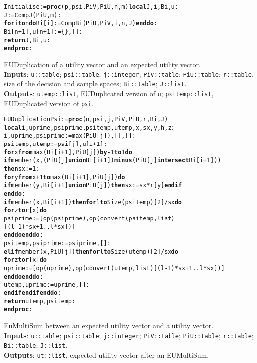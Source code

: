 \vspace{-0.4cm}
\begin{alltt}
Initialise := \textbf{proc}(p, psi, PiV, PiU, n, m) \textbf{local} J, i, Bi, u:
J := CompJ(PiU, m):
\textbf{for} i \textbf{to} n \textbf{do}  Bi[i] := CompBi(PiU, PiV, i, n, J) \textbf{end do}:
Bi[n+1], u[n+1] := \{\}, []:
\textbf{return} J, Bi, u:
\textbf{end proc}:
\end{alltt}


\noindent EUDuplication of a utility vector and an expected utility vector.\\
\textbf{Inputs}: \verb|u::table|; \verb|psi::table|; \verb|j::integer|; \verb|PiV::table|; \verb|PiU::table|;
\verb|r::table|, size of the decision and sample spaces; \verb|Bi::table|; \verb|J::list|.\\
\textbf{Outputs}: \verb|utemp::list|, EUDuplicated version of \verb|u|; \verb|psitemp::list|, EUDuplicated version of \verb|psi|.

\vspace{-0.4cm}
\begin{alltt}
EUDuplicationPsi := \textbf{proc}(u, psi, j, PiV, PiU, r, Bi, J)
\textbf{local} i, uprime, psiprime, psitemp, utemp, x, sx, y, h, z:
i, uprime, psiprime:= max(PiU[j]), [], []: 
psitemp, utemp:= psi[j], u[i+1]:
\textbf{for} x \textbf{from} max(Bi[i+1], PiU[j]) \textbf{by} -1 \textbf{to} 1 \textbf{do}
  \textbf{if} member(x, (PiU[j] \textbf{union} Bi[i+1]) \textbf{minus} (PiU[j] \textbf{intersect} Bi[i+1])) 
    \textbf{then} sx := 1:
    \textbf{for} y \textbf{from} x+1 \textbf{to} max(Bi[i+1], PiU[j]) \textbf{do}
      \textbf{if} member(y, Bi[i+1] \textbf{union} PiU[j]) \textbf{then} sx := sx*r[y] \textbf{end if}
    \textbf{end do}:
    \textbf{if} member(x, Bi[i+1]) \textbf{then} \textbf{for} l \textbf{to} Size(psitemp)[2]/sx \textbf{do} 
      \textbf{for} z \textbf{to} r[x] \textbf{do}
      psiprime := [op(psiprime), op(convert(psitemp, list)
      [(l-1)*sx+1 .. l*sx])]
      \textbf{end do} \textbf{end do}:
      psitemp, psiprime := psiprime, []:
    \textbf{elif} member(x, PiU[j]) \textbf{then} \textbf{for} l \textbf{to} Size(utemp)[2]/sx \textbf{do}
     \textbf{for} z \textbf{to} r[x] \textbf{do} 
     uprime := [op(uprime),op(convert(utemp, list)[(l-1)*sx+1..l*sx])]
     \textbf{end do} \textbf{end do}:
     utemp,  uprime := uprime, []:
\textbf{end if} \textbf{end if} \textbf{end do}:
\textbf{return} utemp, psitemp:
\textbf{end proc}:
\end{alltt}


EuMultiSum between an expected utility vector and a utility vector. \\
\textbf{Inputs}: \verb|u::table|; \verb|psi::table|; \verb|j::integer|; \verb|PiV::table|; \verb|PiU::table|;
 \verb|r::table|; \verb|Bi::table|; \verb|J::list|.\\
\textbf{Outputs}: \verb|ut::list|, expected utility vector after an EUMultiSum.  

